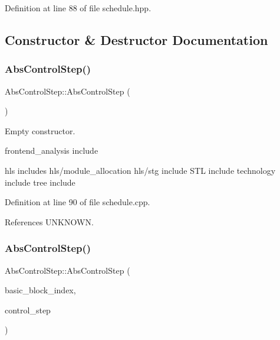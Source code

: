 Definition at line 88 of file schedule.\+hpp.



\subsection{Constructor \& Destructor Documentation}
\mbox{\label{structAbsControlStep_aaabb6e2bd6562f29b95f8259e5dfc4a4}} 
\subsubsection{\texorpdfstring{Abs\+Control\+Step()}{AbsControlStep()}\hspace{0.1cm}{\footnotesize\ttfamily [1/2]}}
{\footnotesize\ttfamily Abs\+Control\+Step\+::\+Abs\+Control\+Step (\begin{DoxyParamCaption}{ }\end{DoxyParamCaption})}



Empty constructor. 

frontend\+\_\+analysis include

hls includes hls/module\+\_\+allocation hls/stg include S\+TL include technology include tree include 

Definition at line 90 of file schedule.\+cpp.



References U\+N\+K\+N\+O\+WN.

\mbox{\label{structAbsControlStep_a2559549c06bfc138bd9829b7874770b4}} 
\subsubsection{\texorpdfstring{Abs\+Control\+Step()}{AbsControlStep()}\hspace{0.1cm}{\footnotesize\ttfamily [2/2]}}
{\footnotesize\ttfamily Abs\+Control\+Step\+::\+Abs\+Control\+Step (\begin{DoxyParamCaption}\item[{const unsigned int}]{basic\+\_\+block\+\_\+index,  }\item[{const Control\+Step}]{control\+\_\+step }\end{DoxyParamCaption})}



